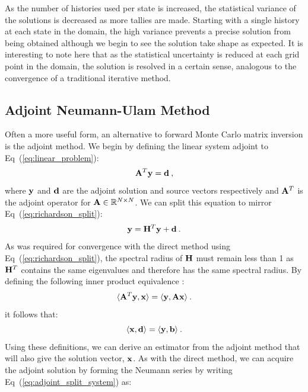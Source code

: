 As the number of histories used per state is increased, the
statistical variance of the solutions is decreased as more tallies are
made. Starting with a single history at each state in the domain, the
high variance prevents a precise solution from being obtained although
we begin to see the solution take shape as expected. It is interesting
to note here that as the statistical uncertainty is reduced at each
grid point in the domain, the solution is resolved in a certain sense,
analogous to the convergence of a traditional iterative method.
\clearpage

\subsection{Adjoint Neumann-Ulam Method}
\label{sec:adjoint_mc}
Often a more useful form, an alternative to forward Monte Carlo matrix
inversion is the adjoint method. We begin by defining the linear
system adjoint to Eq~(\ref{eq:linear_problem}):
\begin{equation}
  \mathbf{A}^T \mathbf{y} = \mathbf{d}\:,
  \label{eq:adjoint_linear_problem}
\end{equation}
where $\mathbf{y}$ and $\mathbf{d}$ are the adjoint solution and source
vectors respectively and $\mathbf{A}^T$ is the adjoint operator for
$\mathbf{A} \in \mathbb{R}^{N \times N}$. We can split this equation to
mirror Eq~(\ref{eq:richardson_split}):
\begin{equation}
  \mathbf{y} = \mathbf{H}^T \mathbf{y} + \mathbf{d}\:.
  \label{eq:adjoint_split_system}
\end{equation}
As was required for convergence with the direct method using
Eq~(\ref{eq:richardson_split}), the spectral radius of $\mathbf{H}$ must
remain less than 1 as $\mathbf{H}^T$ contains the same eigenvalues and
therefore has the same spectral radius. By defining the following
inner product equivalence \cite{spanier_monte_1969}:
\begin{equation}
  \langle \mathbf{A}^T \mathbf{y}, \mathbf{x} \rangle = \langle \mathbf{y}, \mathbf{A}
  \mathbf{x} \rangle\:.
  \label{eq:adjoint_operator_product}
\end{equation}
it follows that:
\begin{equation}
  \langle \mathbf{x}, \mathbf{d} \rangle = \langle \mathbf{y}, \mathbf{b} \rangle\:.
  \label{eq:adjoint_vector_relation}
\end{equation}
Using these definitions, we can derive an estimator from the adjoint
method that will also give the solution vector, $\mathbf{x}$. As with the
direct method, we can acquire the adjoint solution by forming the
Neumann series by writing Eq~(\ref{eq:adjoint_split_system}) as:
